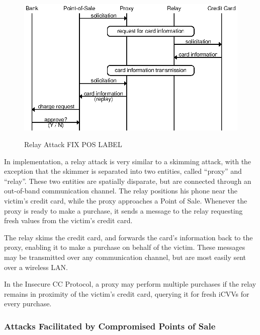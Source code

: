 \begin{figure}
  \caption{Relay Attack FIX POS LABEL}
  \centering
    \includegraphics{img/attack-3-relay.eps}
  \label{fig:insecure-relay}
\end{figure}

In implementation, a relay attack is very similar to a skimming attack, with the exception that the skimmer is separated into two entities, called ``proxy'' and ``relay''.
These two entities are spatially disparate, but are connected through an out-of-band communication channel.
The relay positions his phone near the victim's credit card, while the proxy approaches a Point of Sale.
Whenever the proxy is ready to make a purchase, it sends a message to the relay requesting fresh values from the victim's credit card.

The relay skims the credit card, and forwards the card's information back to the proxy, enabling it to make a purchase on behalf of the victim.
These messages may be transmitted over any communication channel, but are most easily sent over a wireless LAN.

In the Insecure CC Protocol, a proxy may perform multiple purchases if the relay remains in proximity of the victim's credit card, querying it for fresh iCVVs for every purchase.





\subsubsection{Attacks Facilitated by Compromised Points of Sale}
\label{sec:insecure-compromised}


